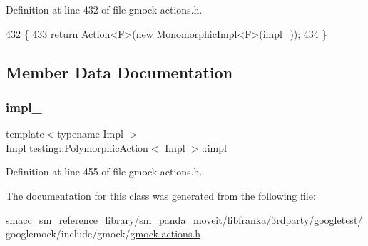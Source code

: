 Definition at line 432 of file gmock-\/actions.\+h.


\begin{DoxyCode}
432                              \{
433     \textcolor{keywordflow}{return} Action<F>(\textcolor{keyword}{new} MonomorphicImpl<F>(\hyperlink{classtesting_1_1PolymorphicAction_ac072ea4c539fd1c6be75798fe9d801f4}{impl\_}));
434   \}
\end{DoxyCode}


\subsection{Member Data Documentation}
\mbox{\label{classtesting_1_1PolymorphicAction_ac072ea4c539fd1c6be75798fe9d801f4}} 
\subsubsection{\texorpdfstring{impl\+\_\+}{impl\_}}
{\footnotesize\ttfamily template$<$typename Impl $>$ \\
Impl \hyperlink{classtesting_1_1PolymorphicAction}{testing\+::\+Polymorphic\+Action}$<$ Impl $>$\+::impl\+\_\+\hspace{0.3cm}{\ttfamily [private]}}



Definition at line 455 of file gmock-\/actions.\+h.



The documentation for this class was generated from the following file\+:\begin{DoxyCompactItemize}
\item 
smacc\+\_\+sm\+\_\+reference\+\_\+library/sm\+\_\+panda\+\_\+moveit/libfranka/3rdparty/googletest/googlemock/include/gmock/\hyperlink{gmock-actions_8h}{gmock-\/actions.\+h}\end{DoxyCompactItemize}
